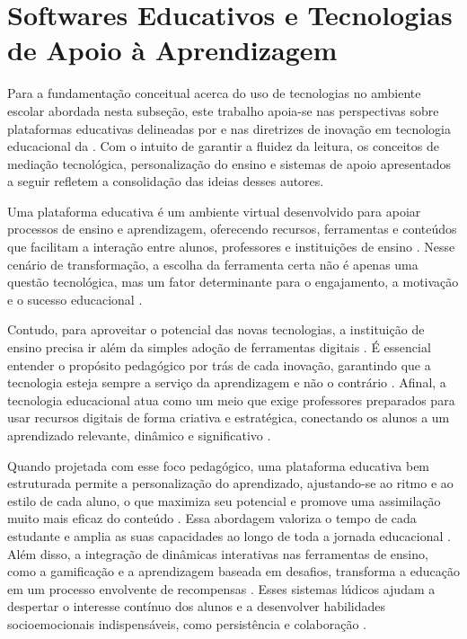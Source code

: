 \section{Softwares Educativos e Tecnologias de Apoio à Aprendizagem}

Para a fundamentação conceitual acerca do uso de tecnologias no ambiente escolar abordada nesta subseção, este trabalho apoia-se nas perspectivas sobre plataformas educativas delineadas por  e nas diretrizes de inovação em tecnologia educacional da . Com o intuito de garantir a fluidez da leitura, os conceitos de mediação tecnológica, personalização do ensino e sistemas de apoio apresentados a seguir refletem a consolidação das ideias desses autores.

Uma plataforma educativa é um ambiente virtual desenvolvido para apoiar processos de ensino e aprendizagem, oferecendo recursos, ferramentas e conteúdos que facilitam a interação entre alunos, professores e instituições de ensino . Nesse cenário de transformação, a escolha da ferramenta certa não é apenas uma questão tecnológica, mas um fator determinante para o engajamento, a motivação e o sucesso educacional .

Contudo, para aproveitar o potencial das novas tecnologias, a instituição de ensino precisa ir além da simples adoção de ferramentas digitais . É essencial entender o propósito pedagógico por trás de cada inovação, garantindo que a tecnologia esteja sempre a serviço da aprendizagem e não o contrário . Afinal, a tecnologia educacional atua como um meio que exige professores preparados para usar recursos digitais de forma criativa e estratégica, conectando os alunos a um aprendizado relevante, dinâmico e significativo .

Quando projetada com esse foco pedagógico, uma plataforma educativa bem estruturada permite a personalização do aprendizado, ajustando-se ao ritmo e ao estilo de cada aluno, o que maximiza seu potencial e promove uma assimilação muito mais eficaz do conteúdo . Essa abordagem valoriza o tempo de cada estudante e amplia as suas capacidades ao longo de toda a jornada educacional . Além disso, a integração de dinâmicas interativas nas ferramentas de ensino, como a gamificação e a aprendizagem baseada em desafios, transforma a educação em um processo envolvente de recompensas . Esses sistemas lúdicos ajudam a despertar o interesse contínuo dos alunos e a desenvolver habilidades socioemocionais indispensáveis, como persistência e colaboração .


